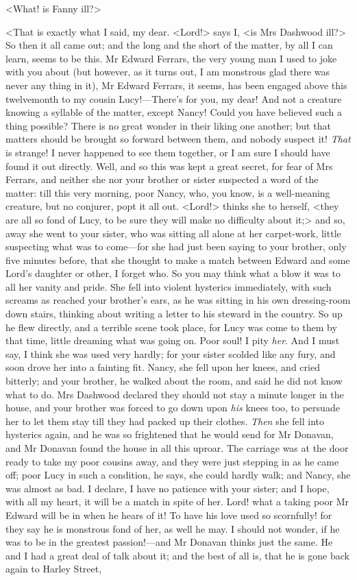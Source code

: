 <What! is Fanny ill?>

<That is exactly what I said, my dear. <Lord!> says I, <is Mrs Dashwood ill?> So then it all came out; and the long and the short of the matter, by all I can learn, seems to be this. Mr Edward Ferrars, the very young man I used to joke with you about (but however, as it turns out, I am monstrous glad there was never any thing in it), Mr Edward Ferrars, it seems, has been engaged above this twelvemonth to my cousin Lucy!—There's for you, my dear! And not a creature knowing a syllable of the matter, except Nancy! Could you have believed such a thing possible? There is no great wonder in their liking one another; but that matters should be brought so forward between them, and nobody suspect it! \textit{That} is strange! I never happened to see them together, or I am sure I should have found it out directly. Well, and so this was kept a great secret, for fear of Mrs Ferrars, and neither she nor your brother or sister suspected a word of the matter: till this very morning, poor Nancy, who, you know, is a well-meaning creature, but no conjurer, popt it all out. <Lord!> thinks she to herself, <they are all so fond of Lucy, to be sure they will make no difficulty about it;> and so, away she went to your sister, who was sitting all alone at her carpet-work, little suspecting what was to come—for she had just been saying to your brother, only five minutes before, that she thought to make a match between Edward and some Lord's daughter or other, I forget who. So you may think what a blow it was to all her vanity and pride. She fell into violent hysterics immediately, with such screams as reached your brother's ears, as he was sitting in his own dressing-room down stairs, thinking about writing a letter to his steward in the country. So up he flew directly, and a terrible scene took place, for Lucy was come to them by that time, little dreaming what was going on. Poor soul! I pity \textit{her}. And I must say, I think she was used very hardly; for your sister scolded like any fury, and soon drove her into a fainting fit. Nancy, she fell upon her knees, and cried bitterly; and your brother, he walked about the room, and said he did not know what to do. Mrs Dashwood declared they should not stay a minute longer in the house, and your brother was forced to go down upon \textit{his} knees too, to persuade her to let them stay till they had packed up their clothes. \textit{Then} she fell into hysterics again, and he was so frightened that he would send for Mr Donavan, and Mr Donavan found the house in all this uproar. The carriage was at the door ready to take my poor cousins away, and they were just stepping in as he came off; poor Lucy in such a condition, he says, she could hardly walk; and Nancy, she was almost as bad. I declare, I have no patience with your sister; and I hope, with all my heart, it will be a match in spite of her. Lord! what a taking poor Mr Edward will be in when he hears of it! To have his love used so scornfully! for they say he is monstrous fond of her, as well he may. I should not wonder, if he was to be in the greatest passion!—and Mr Donavan thinks just the same. He and I had a great deal of talk about it; and the best of all is, that he is gone back again to Harley Street, 